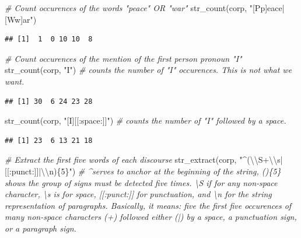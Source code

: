 \documentclass[
  12pt,
]{style/krantz}
\newenvironment{Shaded}{\begin{snugshade}}{\end{snugshade}}
\newcommand{\CommentTok}[1]{\textcolor[rgb]{0.56,0.35,0.01}{\textit{#1}}}
\newcommand{\FunctionTok}[1]{\textcolor[rgb]{0.00,0.00,0.00}{#1}}
\newcommand{\NormalTok}[1]{#1}
\newcommand{\SpecialCharTok}[1]{\textcolor[rgb]{0.00,0.00,0.00}{#1}}
\newcommand{\StringTok}[1]{\textcolor[rgb]{0.31,0.60,0.02}{#1}}
\begin{document}
\begin{Shaded}
\begin{Highlighting}[]
\CommentTok{\# Count occurences of the words "peace" OR "war"}
\FunctionTok{str\_count}\NormalTok{(corp, }\StringTok{"[Pp]eace|[Ww]ar"}\NormalTok{)}
\end{Highlighting}
\end{Shaded}

\begin{verbatim}
## [1]  1  0 10 10  8
\end{verbatim}

\begin{Shaded}
\begin{Highlighting}[]
\CommentTok{\# Count occurences of the mention of the first person pronoun "I"}
\FunctionTok{str\_count}\NormalTok{(corp, }\StringTok{"I"}\NormalTok{) }\CommentTok{\# counts the number of "I" occurences. This is not what we want.}
\end{Highlighting}
\end{Shaded}

\begin{verbatim}
## [1] 30  6 24 23 28
\end{verbatim}

\begin{Shaded}
\begin{Highlighting}[]
\FunctionTok{str\_count}\NormalTok{(corp, }\StringTok{"[I][[:space:]]"}\NormalTok{) }\CommentTok{\# counts the number of "I" followed by a space.}
\end{Highlighting}
\end{Shaded}

\begin{verbatim}
## [1] 23  6 13 21 18
\end{verbatim}

\begin{Shaded}
\begin{Highlighting}[]
\CommentTok{\# Extract the first five words of each discourse}
\FunctionTok{str\_extract}\NormalTok{(corp, }\StringTok{"\^{}(}\SpecialCharTok{\textbackslash{}\textbackslash{}}\StringTok{S+}\SpecialCharTok{\textbackslash{}\textbackslash{}}\StringTok{s|[[:punct:]]|}\SpecialCharTok{\textbackslash{}\textbackslash{}}\StringTok{n)\{5\}"}\NormalTok{) }\CommentTok{\# \^{}serves to anchor at the beginning of the string, ()\{5\} shows the group of signs must be detected five times. \textbackslash{}S if for any non{-}space character,  \textbackslash{}s is for space, [[:punct:]] for punctuation, and \textbackslash{}n for the string representation of paragraphs. Basically, it means: five the first five occurences of many non{-}space characters (+) followed either (|) by a space, a punctuation sign, or a paragraph sign.}
\end{Highlighting}
\end{Shaded}
\end{document}
